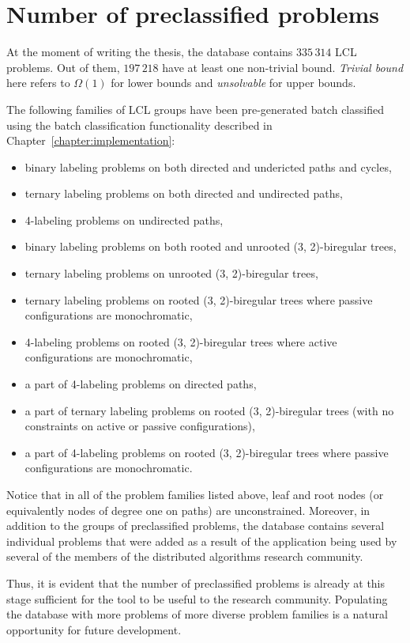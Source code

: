 \section{Number of preclassified problems}

At the moment of writing the thesis, the database contains $335\,314$
LCL problems. Out of them, $197\,218$ have at least one non-trivial bound. \emph{Trivial bound} here
refers to $\Omega(1)$ for lower bounds and \emph{unsolvable} for upper bounds.

The following families of LCL groups have been pre-generated batch classified
using the batch classification functionality described in Chapter~\ref{chapter:implementation}:

\begin{itemize}
  \item binary labeling problems on both directed and undericted paths and cycles,
  \item ternary labeling problems on both directed and undirected paths,
  \item 4-labeling problems on undirected paths,
  \item binary labeling problems on both rooted and unrooted (3, 2)-biregular trees,
  \item ternary labeling problems on unrooted (3, 2)-biregular trees,
  \item ternary labeling problems on rooted (3, 2)-biregular trees where passive configurations are monochromatic,
  \item 4-labeling problems on rooted (3, 2)-biregular trees where active configurations are monochromatic,
  \item a part of 4-labeling problems on directed paths,
  \item a part of ternary labeling problems on rooted (3, 2)-biregular trees (with no constraints on active or passive configurations),
  \item a part of 4-labeling problems on rooted (3, 2)-biregular trees where passive configurations are monochromatic.
\end{itemize}
Notice that in all of the problem families listed above, leaf and root nodes
(or equivalently nodes of degree one on paths) are unconstrained. Moreover, in addition to the
groups of preclassified problems, the database contains several individual problems that
were added as a result of the application being used by several of the members of the
distributed algorithms research community.

Thus, it is evident that the number of preclassified problems is already at this stage sufficient
for the tool to be useful to the research community. Populating the database
with more problems of more diverse problem families is a natural opportunity for future
development.

